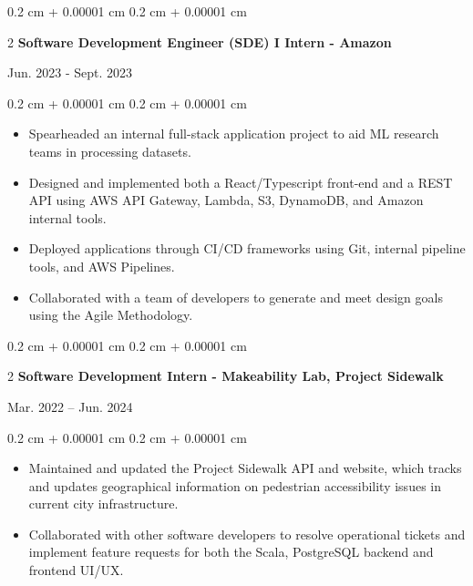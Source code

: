 \documentclass[10pt, letterpaper]{article}
\newenvironment{highlightsforbulletentries}{
    \begin{itemize}[
        topsep=0.10 cm,
        parsep=0.10 cm,
        partopsep=0pt,
        itemsep=0pt,
        leftmargin=10pt
    ]
}{
    \end{itemize}
} %
\newenvironment{onecolentry}{
    \begin{adjustwidth}{
        0.2 cm + 0.00001 cm
    }{
        0.2 cm + 0.00001 cm
    }
}{
    \end{adjustwidth}
} %
\newenvironment{twocolentry}[2][]{
    \onecolentry
    \def\secondColumn{#2}
    \setcolumnwidth{\fill, 4.5 cm}
    \begin{paracol}{2}
}{
    \switchcolumn \raggedleft \secondColumn
    \end{paracol}
    \endonecolentry
} %
\begin{document}
        \vspace{0.2 cm}

        \begin{twocolentry}{
            Jun. 2023 - Sept. 2023
        }{
            \textbf{Software Development Engineer (SDE) I Intern - Amazon}
        }
        \end{twocolentry}
        \vspace{0.1 cm}
        \begin{onecolentry}
            \begin{highlightsforbulletentries}
                \item Spearheaded an internal full-stack application project to aid ML research teams in processing datasets.
                \item Designed and implemented both a React/Typescript front-end and a REST API using AWS API Gateway, Lambda, S3, DynamoDB, and Amazon internal tools.
                \item Deployed applications through CI/CD frameworks using Git, internal pipeline tools, and AWS Pipelines.
                \item Collaborated with a team of developers to generate and meet design goals using the Agile Methodology.
            \end{highlightsforbulletentries}
        \end{onecolentry}

        \vspace{0.2 cm}

        \begin{twocolentry}{
            Mar. 2022 – Jun. 2024
        }{
            \textbf{Software Development Intern - Makeability Lab, Project Sidewalk}
        }
        \end{twocolentry}
        \vspace{0.1 cm}
        \begin{onecolentry}
            \begin{highlightsforbulletentries}
                \item Maintained and updated the Project Sidewalk API and website, which tracks and updates geographical
                information on pedestrian accessibility issues in current city infrastructure.
                \item Collaborated with other software developers to resolve operational tickets
                and implement feature requests for both the Scala, PostgreSQL backend and frontend UI/UX.
            \end{highlightsforbulletentries}
        \end{onecolentry}
\end{document}
